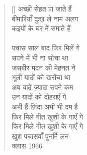 \begin{verse}[\versewidth]
{अच्छी सेहत पा जाते हैं\\
बीमारियाँ दुःख ले नाम अलग\\
कइयों के घर में समाते हैं\\
\\
पचास साल बाद फिर मिलें गे\\
सपने में भी ना सोचा था\\
जसबीर मदन की मेहनत ने\\
भूली यादों को खरोंचा था\\
अब यादें ज़्यादा सपने कम\\
उन यादों को दोहराएँ गे\\
अभी हैं ज़िंदा अभी भी दम है\\
फिर मिले गीत खुशी के गाएँ गे\\
फिर मिले गीत खुशी के गाएँ गे\\
खुश पचासवाँ पुनर्मि लन\\
क्लास 1966
}\end{verse}
